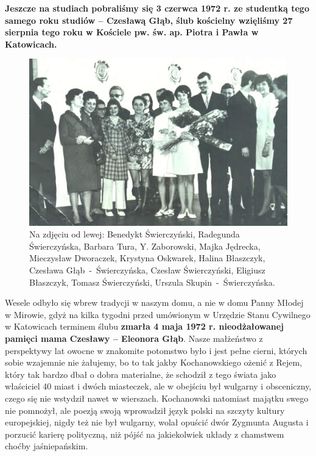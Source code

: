 \textbf{Jeszcze na studiach pobraliśmy się 3 czerwca 1972 r. ze studentką tego samego roku studiów – Czesławą Głąb, ślub kościelny wzięliśmy 27 sierpnia tego roku w Kościele pw. św. ap. Piotra i Pawła w Katowicach.}
\begin{figure}[!h]
\begin{center}
\includegraphics[width=\textwidth]{photo/czeslawa_czeslaw_swierczynscy_slub_2.jpg}
\caption[Ślub Czesławy i Czesława Świerczyńskich -- zdjęcie zbiorowe]{Na zdjęciu od lewej: Benedykt Świerczyński, Radegunda Świerczyńska, Barbara Tura, Y. Zaborowski, Majka Jędrecka, Mieczysław Dworaczek, Krystyna Oskwarek, Halina Błaszczyk, Czesława Głąb~-~Świerczyńska, Czesław Świerczyński, Eligiusz Błaszczyk, Tomasz Świerczyński, Urszula Skupin~-~Świerczyńska.}
\end{center}
\end{figure}

Wesele odbyło się wbrew tradycji w naszym domu, a nie w domu Panny Młodej w Mirowie, gdyż na kilka tygodni przed umówionym w Urzędzie Stanu Cywilnego w Katowicach terminem ślubu \textbf{zmarła 4 maja 1972 r. nieodżałowanej pamięci mama Czesławy – Eleonora Głąb}. Nasze małżeństwo z perspektywy lat owocne w znakomite potomstwo było i jest pełne cierni, których sobie wzajemnie nie żałujemy, bo to tak jakby Kochanowskiego ożenić z Rejem, który tak bardzo dbał o dobra materialne, że schodził z tego świata jako właściciel 40 miast i dwóch miasteczek, ale w obejściu był wulgarny i obsceniczny, czego się nie wstydził nawet w wierszach. Kochanowski natomiast majątku swego nie pomnożył, ale poezją swoją wprowadził język polski na szczyty kultury europejskiej, nigdy też nie był wulgarny, wolał opuścić dwór Zygmunta Augusta i porzucić karierę polityczną, niż pójść na jakiekolwiek układy z chamstwem choćby jaśniepańskim.

